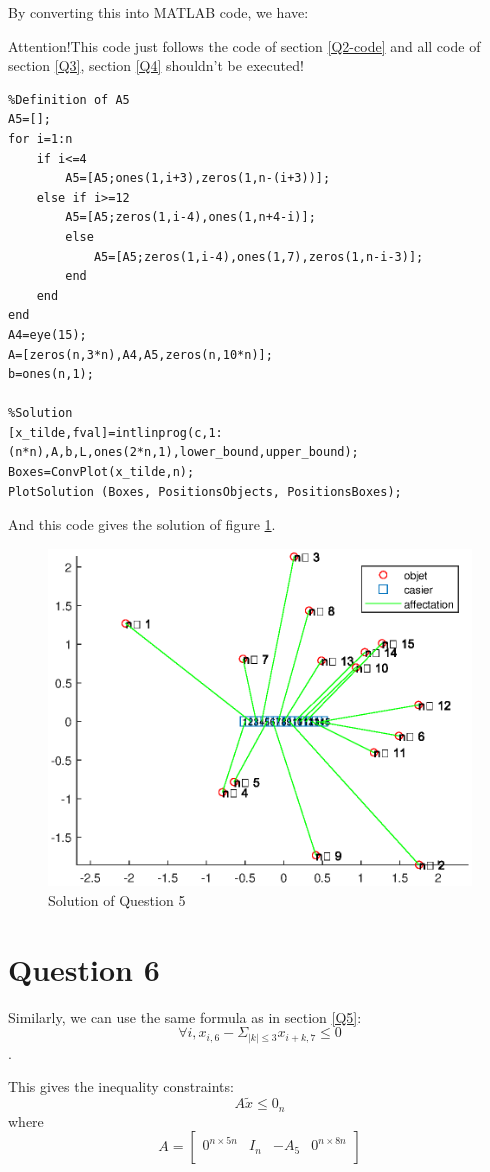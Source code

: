 \documentclass{CSArticle}[english]
\begin{document}
By converting this into MATLAB code, we have:
\par {\color{red}Attention!This code just follows the code of section \ref{Q2-code} and all code of section \ref{Q3}, section \ref{Q4} shouldn't be executed!}
\begin{lstlisting}[style=MATLAB]
%% Q5
%Definition of A5
A5=[];
for i=1:n
    if i<=4
        A5=[A5;ones(1,i+3),zeros(1,n-(i+3))];
    else if i>=12
        A5=[A5;zeros(1,i-4),ones(1,n+4-i)];
        else
            A5=[A5;zeros(1,i-4),ones(1,7),zeros(1,n-i-3)];
        end
    end
end
A4=eye(15);
A=[zeros(n,3*n),A4,A5,zeros(n,10*n)];
b=ones(n,1);

%Solution
[x_tilde,fval]=intlinprog(c,1:(n*n),A,b,L,ones(2*n,1),lower_bound,upper_bound);
Boxes=ConvPlot(x_tilde,n);
PlotSolution (Boxes, PositionsObjects, PositionsBoxes);
\end{lstlisting}
And this code gives the solution of figure \ref{fig:Q5}.
\begin{figure}[ht]
\centering
\includegraphics[scale=0.6]{figure/Q5.eps}
\caption{Solution of Question 5}
\label{fig:Q5}
\end{figure}

\section{Question 6}
\label{Q6}
Similarly, we can use the same formula as in section \ref{Q5}:
\begin{equation}
    \forall i, x_{i,6}-\Sigma _{|k|\le 3}x_{i+k,7} \le 0
\end{equation}.
\par
This gives the inequality constraints:
\begin{equation}
    A\tilde{x}\le 0_{n}
\end{equation}
where
\begin{equation}
    A=\left[ \begin{matrix}
	0^{n\times 5n}&		I_n&		-A_5&		0^{n\times 8n}\\
\end{matrix} \right] 
\end{equation}
\end{document}
